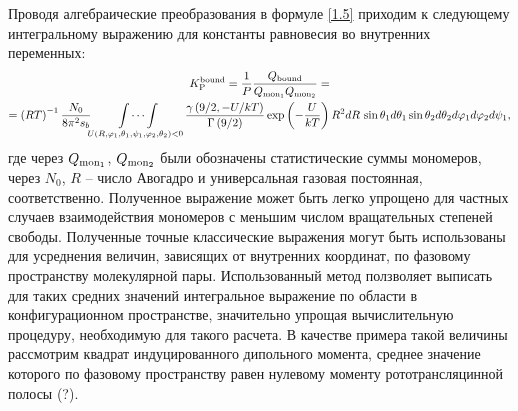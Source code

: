 \documentclass[
  14pt,
  a1paper,
  portrait, 
  margin=0mm,
  innermargin=15mm,
  blockverticalspace=0mm,
  colspace=0mm,
  subcolspace=0mm
]{tikzposter}
\newcommand{\lb}{\left(}
\newcommand{\rb}{\right)}
\begin{document}
\begin{columns}
{}
\block[titleoffsety=1cm,bodyoffsety=1.5cm]{}
{
	Проводя алгебраические преобразования в формуле \eqref{1.5} приходим к следующему интегральному выражению для константы равновесия во внутренних переменных:
	\begin{gather}
			K_\textup{P}^\textup{bound} = \frac{1}{P} \frac{Q_\textup{bound}}{Q_{\textup{mon}_1} Q_{\textup{mon}_2}} = \notag \\ 
			= \lb R T \rb^{-1} \frac{N_0}{8 \pi^2 s_b} \idotsint\limits_{U(R, \varphi_1, \theta_1, \psi_1, \varphi_2, \theta_2) < 0} \frac{\gamma \lb 9/2, - U / k T \rb}{\Gamma \lb 9 / 2 \rb} \exp \lb - \frac{U}{kT} \rb R^2 dR \, \sin \theta_1 d \theta_1 \sin \theta_2 d\theta_2 d \varphi_1 d \varphi_2 d \psi_1, \label{1.6}
	\end{gather}
	где через $Q_{\textup{mon}_1}$, $Q_{\textup{mon}_2}$ были обозначены статистические суммы мономеров, через $N_0$, $R$ -- число Авогадро и универсальная газовая постоянная, соответственно. Полученное выражение может быть легко упрощено для частных случаев взаимодействия мономеров с меньшим числом вращательных степеней свободы. 
}
{
	Полученные точные классические выражения могут быть использованы для усреднения величин, зависящих от внутренних координат, по фазовому пространству молекулярной пары. Использованный метод ползволяет выписать для таких средних значений интегральное выражение по области в конфигурационном пространстве, значительно упрощая вычислительную процедуру, необходимую для такого расчета. В качестве примера такой величины рассмотрим квадрат индуцированного дипольного момента, среднее значение которого по фазовому пространству равен нулевому моменту рототрансляцинной полосы (?).
}

\end{columns}
\end{document}
